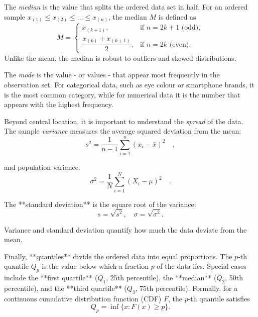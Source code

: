 \documentclass{book}
\begin{document}
\medskip

The \textit{median} is the value that splits the ordered data set in half. For an ordered sample $x_{(1)} \le x_{(2)} \le \dots \le x_{(n)}$, the median $M$ is defined as
\begin{equation}
	M = \begin{cases} 
		x_{(k+1)}, & \text{if } n = 2k+1 \text{ (odd)}, \\
		\dfrac{x_{(k)} + x_{(k+1)}}{2}, & \text{if } n = 2k \text{ (even)}.
	\end{cases}
\end{equation}
Unlike the mean, the median is robust to outliers and skewed distributions.

The \textit{mode} is the value - or values - that appear most frequently in the observation set. For categorical data, such as eye colour or smartphone brands, it is the most common category, while for numerical data it is the number that appears with the highest frequency.

\medskip

Beyond central location, it is important to understand the \textit{spread} of the data. The sample \textit{variance} measures the average squared deviation from the mean:
\begin{equation}
	s^2 = \frac{1}{n-1} \sum_{i=1}^{n} (x_i - \bar{x})^2 \quad,
\end{equation}

and population variance.
\begin{equation}
	\sigma^2 = \frac{1}{N} \sum_{i=1}^{N} (X_i - \mu)^2 \quad .
\end{equation}

The **standard deviation** is the square root of the variance:
\begin{equation}
	s = \sqrt{s^2}, \quad \sigma = \sqrt{\sigma^2}.
\end{equation}

Variance and standard deviation quantify how much the data deviate from the mean.

\medskip

Finally, **quantiles** divide the ordered data into equal proportions. The $p$-th quantile $Q_p$ is the value below which a fraction $p$ of the data lies. Special cases include the **first quartile** ($Q_1$, 25th percentile), the **median** ($Q_2$, 50th percentile), and the **third quartile** ($Q_3$, 75th percentile). Formally, for a continuous cumulative distribution function (CDF) $F$, the $p$-th quantile satisfies
\begin{equation}
	Q_p = \inf \{ x : F(x) \ge p \}.
\end{equation}
\end{document}
